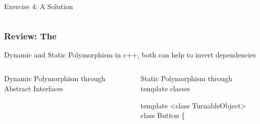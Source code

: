 \documentclass[9pt,handout]{beamer}
\begin{document}
\begin{frame}
\begin{exampleblock}{Exercise 4: A Solution}
\begin{columns}[t]
  \end{columns}
  
\end{exampleblock}
\end{frame}

\begin{frame}[fragile]
  \frametitle{Review: The \secname}
\vfill
\begin{block}{Dynamic and Static Polymorphism}
\small
in c++, both can help to invert dependencies\\
\begin{columns}[t]

    \begin{column}{.45\textwidth}
       \begin{block}{Dynamic Polymorphism through Abstract Interfaces}

          \begin{center}
          \end{center}
       \end{block}
    \end{column}
\pause
    \begin{column}{.45\textwidth}
       \begin{block}{Static Polymorphism through template classes}

          \begin{center}
            \scriptsize
              \begin{semiverbatim}
template <class TurnableObject>
class Button \{


\end{semiverbatim}
\end{center}
\end{block}
\end{column}
\end{columns}
\end{block}
\end{frame}
\end{document}
